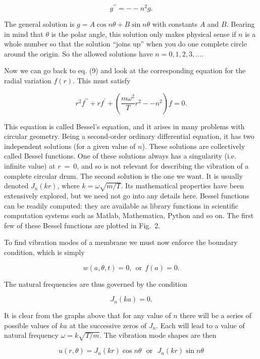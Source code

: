   $$g^{\prime \prime} = -- n^2 g. \tag{10}$$ 

  The general solution is $g=A \cos n \theta+B \sin n \theta$ with constants 
  $A$ and $B$. Bearing in mind that $\theta$ is the polar angle, this solution 
  only makes physical sense if $n$ is a whole number so that the solution 
  ``joins up'' when you do one complete circle around the origin. So the 
  allowed solutions have $n=0, 1, 2, 3,...$. 

  Now we can go back to eq. (9) and look at the corresponding equation for the 
  radial variation $f(r)$. This must satisfy 

  $$r^2 f^{\prime \prime} + r f^{\prime} + \left(\frac{m \omega^2}{T} r^2 -- 
  n^2 \right) f = 0 . \tag{11}$$ 

  This equation is called Bessel’s equation, and it arises in many problems 
  with circular geometry. Being a second-order ordinary differential equation, 
  it has two independent solutions (for a given value of $n$). These solutions 
  are collectively called Bessel functions. One of these solutions always has a 
  singularity (i.e. infinite value) at $r~=~0$, and so is not relevant for 
  describing the vibration of a complete circular drum. The second solution is 
  the one we want. It is usually denoted $J_n(kr)$, where $k= \omega 
  \sqrt{m/T}$. Its mathematical properties have been extensively explored, but 
  we need not go into any details here. Bessel functions can be readily 
  computed: they are available as library functions in scientific computation 
  systems such as Matlab, Mathematica, Python and so on. The first few of these 
  Bessel functions are plotted in Fig.\ 2. 


  To find vibration modes of a membrane we must now enforce the boundary 
  condition, which is simply 

  $$w(a,\theta,t) =0, \mathrm{~~or~~} f(a)=0 . \tag{12}$$ 

  The natural frequencies are thus governed by the condition 

  $$J_n(ka)=0 . \tag{13}$$ 

  It is clear from the graphs above that for any value of $n$ there will be a 
  series of possible values of $ka$ at the successive zeros of $J_n$. Each will 
  lead to a value of natural frequency $\omega=k \sqrt{T/m}$. The vibration 
  mode shapes are then 

  $$u(r,\theta)=J_n(kr) \cos n \theta \mathrm{~~~or~~~}J_n(kr) \sin n \theta 
  \tag{14}$$ 


